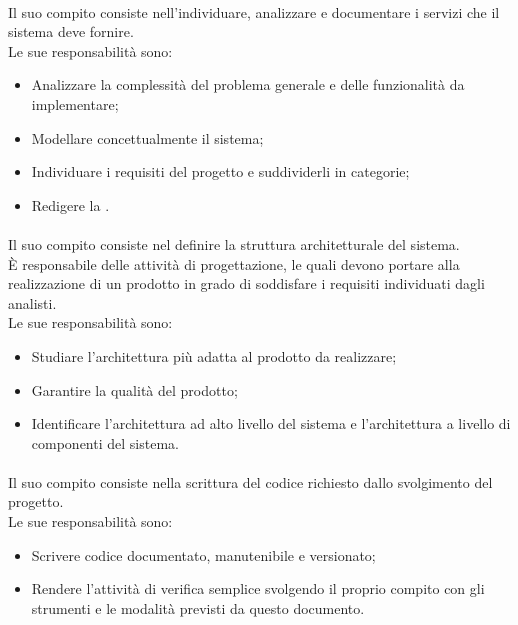 \paragraph*{\roleAnalyst}
Il suo compito consiste nell'individuare, analizzare e documentare i servizi che il sistema deve fornire.\\
Le sue responsabilità sono:
\begin{itemize}
  \item Analizzare la complessità del problema generale e delle funzionalità da implementare;
  \item Modellare concettualmente il sistema;
  \item Individuare i requisiti del progetto e suddividerli in categorie;
  \item Redigere la \docNameVersionAdR{}.
\end{itemize}

\paragraph*{\roleDesigner}
Il suo compito consiste nel definire la struttura architetturale del sistema.\\
È responsabile delle attività di progettazione, le quali devono portare alla realizzazione di un prodotto in grado di soddisfare i requisiti individuati dagli analisti.\\
Le sue responsabilità sono:
\begin{itemize}
  \item Studiare l'architettura più adatta al prodotto da realizzare;
  \item Garantire la qualità del prodotto;
  \item Identificare l'architettura ad alto livello del sistema e l'architettura a livello di componenti del sistema.
\end{itemize}

\paragraph*{\roleProgrammer}
Il suo compito consiste nella scrittura del codice richiesto dallo svolgimento del progetto.\\
Le sue responsabilità sono:
\begin{itemize}
  \item Scrivere codice documentato, manutenibile e versionato;
  \item Rendere l'attività di verifica semplice svolgendo il proprio compito con gli strumenti e le modalità previsti da questo documento.
\end{itemize}

